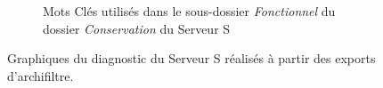 \documentclass[12pt,twoside]{book}
\begin{document}
\begin{figure}[htbp]
\begin{subfigure}{0.65\textwidth}
			\caption{Mots Clés utilisés dans le sous-dossier \textit{Fonctionnel} du dossier \textit{Conservation} du Serveur S}
		\end{subfigure}
		
		\caption[Diagnostic du serveur S]{Graphiques du diagnostic du Serveur S réalisés à partir des exports d'\gls{archifiltre}.}
		\label{fig:diagarchifiltre}
	\end{figure}
	\backmatter %
	
	
	
	
	\printglossaries
	
	
	\listoftables
	
	\listoffigures
	
	\tableofcontents
	
	
\end{document}
